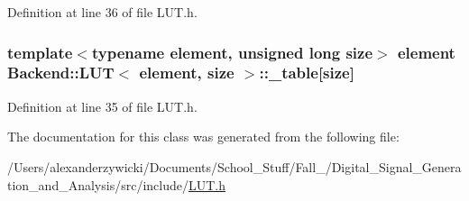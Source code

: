 Definition at line 36 of file L\+U\+T.\+h.

\hypertarget{class_backend_1_1_l_u_t_ae70f3f0c9aaa9e0b85517d8e2c61d9a5}{
\subsubsection[{\+\_\+table}]{\setlength{\rightskip}{0pt plus 5cm}template$<$typename element, unsigned long size$>$ element {\bf Backend\+::\+L\+U\+T}$<$ element, size $>$\+::\+\_\+table\mbox{[}size\mbox{]}\hspace{0.3cm}{\ttfamily [protected]}}}\label{class_backend_1_1_l_u_t_ae70f3f0c9aaa9e0b85517d8e2c61d9a5}


Definition at line 35 of file L\+U\+T.\+h.



The documentation for this class was generated from the following file\+:\begin{DoxyCompactItemize}
\item 
/\+Users/alexanderzywicki/\+Documents/\+School\+\_\+\+Stuff/\+Fall\+\_/\+Digital\+\_\+\+Signal\+\_\+\+Generation\+\_\+and\+\_\+\+Analysis/src/include/\hyperlink{_l_u_t_8h}{L\+U\+T.\+h}\end{DoxyCompactItemize}

